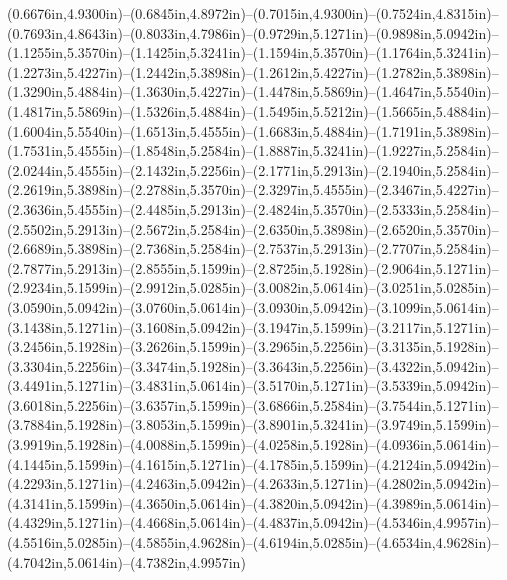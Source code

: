 (0.6676in,4.9300in)--(0.6845in,4.8972in)--(0.7015in,4.9300in)--(0.7524in,4.8315in)--(0.7693in,4.8643in)--(0.8033in,4.7986in)--(0.9729in,5.1271in)--(0.9898in,5.0942in)--(1.1255in,5.3570in)--(1.1425in,5.3241in)--(1.1594in,5.3570in)--(1.1764in,5.3241in)--(1.2273in,5.4227in)--(1.2442in,5.3898in)--(1.2612in,5.4227in)--(1.2782in,5.3898in)--(1.3290in,5.4884in)--(1.3630in,5.4227in)--(1.4478in,5.5869in)--(1.4647in,5.5540in)--(1.4817in,5.5869in)--(1.5326in,5.4884in)--(1.5495in,5.5212in)--(1.5665in,5.4884in)--(1.6004in,5.5540in)--(1.6513in,5.4555in)--(1.6683in,5.4884in)--(1.7191in,5.3898in)--(1.7531in,5.4555in)--(1.8548in,5.2584in)--(1.8887in,5.3241in)--(1.9227in,5.2584in)--(2.0244in,5.4555in)--(2.1432in,5.2256in)--(2.1771in,5.2913in)--(2.1940in,5.2584in)--(2.2619in,5.3898in)--(2.2788in,5.3570in)--(2.3297in,5.4555in)--(2.3467in,5.4227in)--(2.3636in,5.4555in)--(2.4485in,5.2913in)--(2.4824in,5.3570in)--(2.5333in,5.2584in)--(2.5502in,5.2913in)--(2.5672in,5.2584in)--(2.6350in,5.3898in)--(2.6520in,5.3570in)--(2.6689in,5.3898in)--(2.7368in,5.2584in)--(2.7537in,5.2913in)--(2.7707in,5.2584in)--(2.7877in,5.2913in)--(2.8555in,5.1599in)--(2.8725in,5.1928in)--(2.9064in,5.1271in)--(2.9234in,5.1599in)--(2.9912in,5.0285in)--(3.0082in,5.0614in)--(3.0251in,5.0285in)--(3.0590in,5.0942in)--(3.0760in,5.0614in)--(3.0930in,5.0942in)--(3.1099in,5.0614in)--(3.1438in,5.1271in)--(3.1608in,5.0942in)--(3.1947in,5.1599in)--(3.2117in,5.1271in)--(3.2456in,5.1928in)--(3.2626in,5.1599in)--(3.2965in,5.2256in)--(3.3135in,5.1928in)--(3.3304in,5.2256in)--(3.3474in,5.1928in)--(3.3643in,5.2256in)--(3.4322in,5.0942in)--(3.4491in,5.1271in)--(3.4831in,5.0614in)--(3.5170in,5.1271in)--(3.5339in,5.0942in)--(3.6018in,5.2256in)--(3.6357in,5.1599in)--(3.6866in,5.2584in)--(3.7544in,5.1271in)--(3.7884in,5.1928in)--(3.8053in,5.1599in)--(3.8901in,5.3241in)--(3.9749in,5.1599in)--(3.9919in,5.1928in)--(4.0088in,5.1599in)--(4.0258in,5.1928in)--(4.0936in,5.0614in)--(4.1445in,5.1599in)--(4.1615in,5.1271in)--(4.1785in,5.1599in)--(4.2124in,5.0942in)--(4.2293in,5.1271in)--(4.2463in,5.0942in)--(4.2633in,5.1271in)--(4.2802in,5.0942in)--(4.3141in,5.1599in)--(4.3650in,5.0614in)--(4.3820in,5.0942in)--(4.3989in,5.0614in)--(4.4329in,5.1271in)--(4.4668in,5.0614in)--(4.4837in,5.0942in)--(4.5346in,4.9957in)--(4.5516in,5.0285in)--(4.5855in,4.9628in)--(4.6194in,5.0285in)--(4.6534in,4.9628in)--(4.7042in,5.0614in)--(4.7382in,4.9957in) 